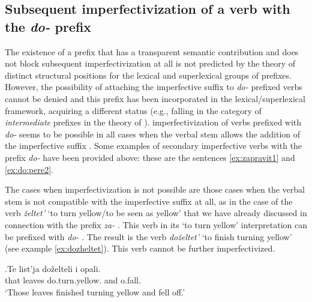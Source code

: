 \subsection{Subsequent imperfectivization  of a verb with the \textit{do-}   prefix}
The existence of a prefix that has a transparent semantic contribution and does not block subsequent imperfectivization  at all is not predicted by the theory of distinct structural positions for the lexical and superlexical groups of prefixes. However, the possibility of attaching the imperfective suffix   to \textit{do-}  prefixed verbs cannot be denied and this prefix has been incorporated in the lexical/superlexical framework, acquiring a different status (e.g., falling in the category of \textit{intermediate} prefixes in the theory of \citealt{Tatevosov:07}). imperfectivization  of verbs prefixed with \textit{do-}   seems to be possible in all cases when the verbal stem allows the addition of the imperfective suffix  . Some examples of secondary imperfective  verbs  with the prefix \textit{do-}   have been provided above: these are the sentences \ref{ex:zapravit1} and \ref{ex:do:pere2}.

The cases when imperfectivization  is not possible are those cases when the verbal stem is not compatible with the imperfective suffix   at all, as in the case of the verb \textit{\v{z}eltet'} `to turn yellow/to be seen as yellow' that we have already discussed in connection with the prefix \textit{za-}  . This verb in its `to turn yellow' interpretation can be prefixed with \textit{do-}  . The result is the verb \textit{do\v{z}eltet'} `to finish turning yellow' (see example \ref{ex:dozheltet}). This verb cannot be further imperfectivized. 

\exg.\label{ex:dozheltet}Te list'ja do\v{z}elteli i opali.\\
that leaves do.turn.yellow. and o.fall.\\
\trans `Those leaves finished turning yellow and fell off.'\\

